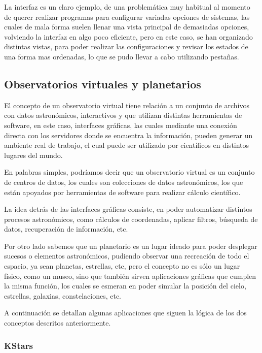 La interfaz es un claro ejemplo,
de una problemática muy habitual al momento
de querer realizar programas para configurar variadas opciones de sistemas,
las cuales de mala forma suelen llenar una vista principal
de demasiadas opciones, volviendo la interfaz en algo poco eficiente,
pero en este caso, se han organizado distintas vistas,
para poder realizar las configuraciones y revisar los estados
de una forma mas ordenadas, lo que se pudo llevar a cabo utilizando
pestañas.

\subsection{Observatorios virtuales y planetarios}

El concepto de un observatorio virtual tiene relación a un conjunto de archivos
con datos astronómicos, interactivos y que utilizan distintas
herramientas de software, en este caso, interfaces gráficas, las cuales
mediante una conexión directa con los servidores donde se encuentra
la información, pueden generar un ambiente real de trabajo,
el cual puede ser utilizado por científicos en distintos lugares del mundo.

En palabras simples, podríamos decir que un observatorio virtual es un conjunto
de centros de datos, los cuales son colecciones de datos astronómicos,
los que están apoyados por herramientas de software para realizar
cálculo científico.

La idea detrás de las interfaces gráficas consiste,
en poder automatizar distintos procesos astronómicos,
como cálculos de coordenadas, aplicar filtros, búsqueda
de datos, recuperación de información, etc.

Por otro lado sabemos que un planetario es un lugar ideado
para poder desplegar sucesos o elementos astronómicos,
pudiendo observar una recreación de todo el espacio,
ya sean planetas, estrellas, etc, pero el concepto
no es sólo un lugar físico, como un museo, sino que también
sirven aplicaciones gráficas que cumplen la misma función,
los cuales se esmeran en poder simular la posición
del cielo, estrellas, galaxias, constelaciones, etc.

A continuación se detallan algunas aplicaciones que siguen la lógica
de los dos conceptos descritos anteriormente.

\subsubsection{KStars}

